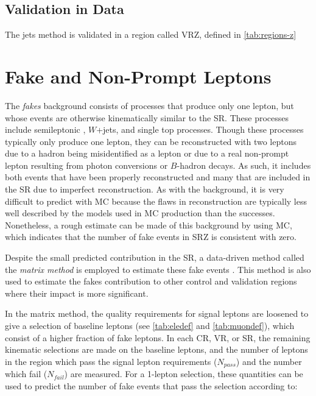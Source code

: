 \subsection{Validation in Data}

The \gjets jets method is validated in a region called VRZ, defined in \autoref{tab:regions-z}


\section{Fake and Non-Prompt Leptons}
\label{sec:bg-fake}

The \textit{fakes} background consists of processes that produce only one lepton, but whose events are otherwise kinematically similar to the \ac{SR}. These processes include semileptonic \ttbar, $W$+jets, and single top processes. Though these processes typically only produce one lepton, they can be reconstructed with two leptons due to a hadron being misidentified as a lepton or due to a real non-prompt lepton resulting from photon conversions or $B$-hadron decays. As such, it includes both events that have been properly reconstructed and many that are included in the \ac{SR} due to imperfect reconstruction. As with the \dyjets background, it is very difficult to predict with \ac{MC} because the flaws in reconstruction are typically less well described by the models used in \ac{MC} production than the successes. Nonetheless, a rough estimate can be made of this background by using \ac{MC}, which indicates that the number of fake events in SRZ is consistent with zero. 

Despite the small predicted contribution in the \ac{SR}, a data-driven method called the \textit{matrix method} is employed to estimate these fake events \cite{SUSY-2013-20}. This method is also used to estimate the fakes contribution to other control and validation regions where their impact is more significant. 

In the matrix method, the quality requirements for signal leptons are loosened to give a selection of baseline leptons (see \autoref{tab:eledef} and \autoref{tab:muondef}), which consist of a higher fraction of fake leptons. In each \ac{CR}, \ac{VR}, or \ac{SR}, the remaining kinematic selections are made on the baseline leptons, and the number of leptons in the region which pass the signal lepton requirements ($N_{pass}$) and the number which fail ($N_{fail}$) are measured. For a 1-lepton selection, these quantities can be used to predict the number of fake events that pass the selection according to:

